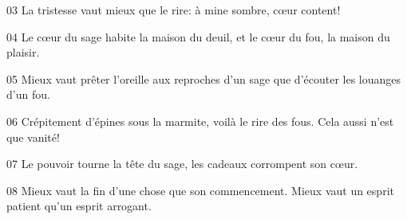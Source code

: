 03 La tristesse vaut mieux que le rire: à mine sombre, cœur content!

04 Le cœur du sage habite la maison du deuil, et le cœur du fou, la maison du plaisir.

05 Mieux vaut prêter l’oreille aux reproches d’un sage que d’écouter les louanges d’un fou.

06 Crépitement d’épines sous la marmite, voilà le rire des fous. Cela aussi n’est que vanité!

07 Le pouvoir tourne la tête du sage, les cadeaux corrompent son cœur.

08 Mieux vaut la fin d’une chose que son commencement. Mieux vaut un esprit patient qu’un esprit arrogant.